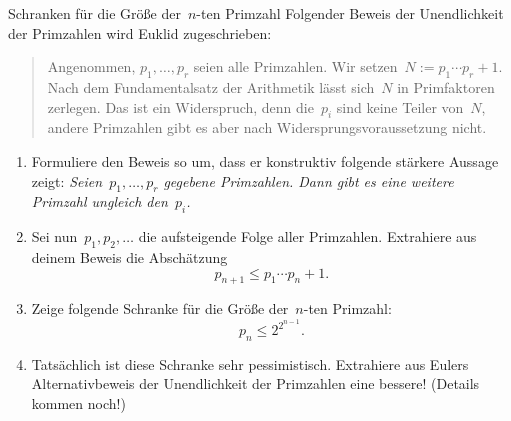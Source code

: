 \documentclass{pizzablatt}
\begin{document}

\begin{aufgabe}{Schranken für die Größe der~$n$-ten Primzahl}
Folgender Beweis der Unendlichkeit der Primzahlen wird Euklid zugeschrieben:

\begin{quote}
Angenommen, $p_1, \ldots, p_r$ seien alle Primzahlen. Wir setzen~$N :=
p_1 \cdots p_r + 1$. Nach dem Fundamentalsatz der Arithmetik lässt sich~$N$ in
Primfaktoren zerlegen. Das ist ein Widerspruch, denn die~$p_i$ sind keine
Teiler von~$N$, andere Primzahlen gibt es aber nach Widersprungsvoraussetzung
nicht.
\end{quote}

\begin{enumerate}
\item Formuliere den Beweis so um, dass er konstruktiv folgende stärkere
Aussage zeigt: \emph{Seien~$p_1,\ldots,p_r$ gegebene Primzahlen. Dann gibt es eine
weitere Primzahl ungleich den~$p_i$.}

\item Sei nun~$p_1,p_2,\ldots$ die aufsteigende Folge aller Primzahlen. Extrahiere
aus deinem Beweis die Abschätzung
\[ p_{n+1} \leq p_1 \cdots p_n + 1. \]

\item Zeige folgende Schranke für die Größe der~$n$-ten Primzahl:
\[ p_n \leq 2^{2^{n-1}}. \]

\item Tatsächlich ist diese Schranke sehr pessimistisch. Extrahiere aus Eulers
Alternativbeweis der Unendlichkeit der Primzahlen eine
bessere! (Details kommen noch!)
\end{enumerate}
\end{aufgabe}
\end{document}
